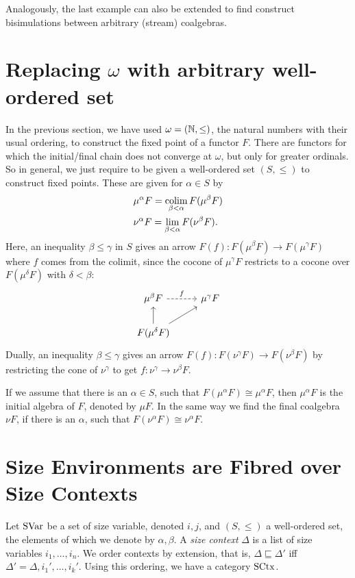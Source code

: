 \documentclass[runningheads,envcountsame,envcountsect,orivec]{llncs}
\begin{document}
Analogously, the last example can also be extended to find construct
bisimulations between arbitrary (stream) coalgebras.

\section{Replacing $\omega$ with arbitrary well-ordered set}
\label{sec:fp-well-ordered-set}
In the previous section, we have used $\omega = (\mathbb{N}, \leq)$, the natural numbers
with their usual ordering, to construct the fixed point of a functor $F$.
There are functors for which the initial/final chain does not converge at
$\omega$, but only for greater ordinals.
So in general, we just require to be given a well-ordered set $(S, \leq)$
to construct fixed points.
These are given for $\alpha \in S$ by
\begin{align*}
  & \mu^{\alpha} F = \operatorname*{colim}_{\beta < \alpha} F(\mu^{\beta} F) \\
  & \nu^{\alpha} F = \lim_{\beta < \alpha} F(\nu^{\beta} F).
\end{align*}
Here, an inequality $\beta \leq \gamma$ in $S$ gives an arrow
$F(f) : F(\mu^{\beta} F) \to F(\mu^{\gamma} F)$ where $f$ comes from the
colimit, since the cocone of $\mu^{\gamma}F$ restricts to a cocone
over $F(\mu^{\delta}F)$ with $\delta < \beta$:
\begin{equation*}
  \begin{tikzcd}
    \mu^{\beta} F \rar[dashed]{f} & \mu^{\gamma}F \\
    F(\mu^{\delta}F) \uar{} \arrow{ur}{}
  \end{tikzcd}
\end{equation*}
Dually, an inequality $\beta \leq \gamma$ gives an arrow
$F(f) : F(\nu^{\gamma} F) \to F(\nu^{\beta} F)$ by restricting the cone of
$\nu^{\gamma}$ to get $f : \nu^{\gamma} \to \nu^{\beta}F$.

If we assume that there is an $\alpha \in S$, such that
$F(\mu^{\alpha}F) \cong \mu^{\alpha}F$, then $\mu^{\alpha}F$ is the initial
algebra of $F$, denoted by $\mu F$.
In the same way we find the final coalgebra $\nu F$, if there is an $\alpha$,
such that $F(\nu^{\alpha} F) \cong \nu^{\alpha}F$.

\section{Size Environments are Fibred over Size Contexts}
\label{sec:size-env}

Let $\mathrm{SVar}$ be a set of size variable, denoted $i, j$, and $(S, \leq)$ a
well-ordered set, the elements of which we denote by $\alpha, \beta$.
A \emph{size context} $\Delta$ is a list of size variables $i_1, \dotsc, i_n$.
We order contexts by extension, that is, $\Delta \sqsubseteq \Delta'$ iff
$\Delta' = \Delta, i_1', \dotsc, i_k'$.
Using this ordering, we have a category $\mathrm{SCtx}$.
\end{document}
